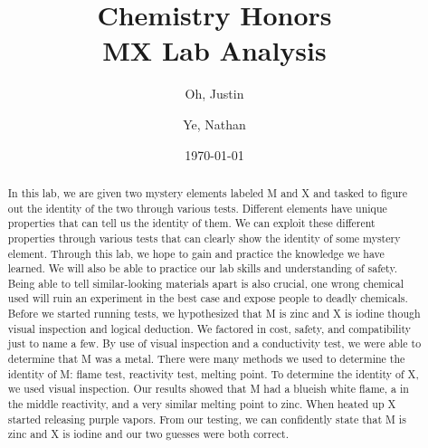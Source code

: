 \documentclass[titlepage]{article}
\title{\Huge{Chemistry Honors \\ MX Lab Analysis}}
\author{\huge{Oh, Justin} \and \huge{Ye, Nathan}}
\date{\LARGE{\today}}
\begin{document}
\maketitle


\begin{abstract}
In this lab, we are given two mystery elements labeled M and X and tasked to figure out the identity of the two through various tests. Different elements have unique properties that can tell us the identity of them. We can exploit these different properties through various tests that can clearly show the identity of some mystery element. Through this lab, we hope to gain and practice the knowledge we have learned. We will also be able to practice our lab skills and understanding of safety. Being able to tell similar-looking materials apart is also crucial, one wrong chemical used will ruin an experiment in the best case and expose people to deadly chemicals. Before we started running tests, we hypothesized that M is zinc and X is iodine though visual inspection and logical deduction. We factored in cost, safety, and compatibility just to name a few. By use of visual inspection and a conductivity test, we were able to determine that M was a metal. There were many methods we used to determine the identity of M: flame test, reactivity test, melting point. To determine the identity of X, we used visual inspection. Our results showed that M had a blueish white flame, a in the middle reactivity, and a very similar melting point to zinc. When heated up X started releasing purple vapors. From our testing, we can confidently state that M is zinc and X is iodine and our two guesses were both correct. 



\end{abstract}

\tableofcontents
\newpage
\end{document}
